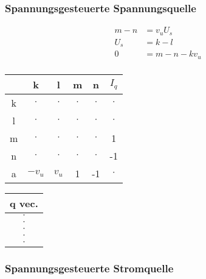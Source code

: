 \begin{multicols*}{2}
    \subsubsection{Spannungsgesteuerte Spannungsquelle}
    \begin{center}

        

        \begin{align*}
            m - n &= v_u U_s\\
            U_s &= k-l\\
            0 &= m - n - k v_u \\            
        \end{align*}

        \begin{tabular}{c|c|c|c|c|c}
              & k & l & m & n & $I_q$ \\\hline
            k & $\cdot$ & $\cdot$ & $\cdot$ & $\cdot$ & $\cdot$ \\\hline
            l & $\cdot$ & $\cdot$ & $\cdot$ & $\cdot$ & $\cdot$ \\\hline
            m & $\cdot$ & $\cdot$ & $\cdot$ & $\cdot$ & 1 \\\hline
            n & $\cdot$ & $\cdot$ & $\cdot$ & $\cdot$ & -1 \\\hline
            a & $-v_u$ & $v_u$ & 1 & -1 & $\cdot$ \\
        \end{tabular}
        \begin{tabular}{|c|}
            q vec. \\\hline
            $\cdot$ \\\hline
            $\cdot$ \\\hline
            $\cdot$ \\\hline
            $\cdot$ \\\hline
            $\cdot$ \\
        \end{tabular}

    \end{center}

    \subsubsection{Spannungsgesteuerte Stromquelle}
    \begin{center}

        


\end{center}
\end{multicols*}
